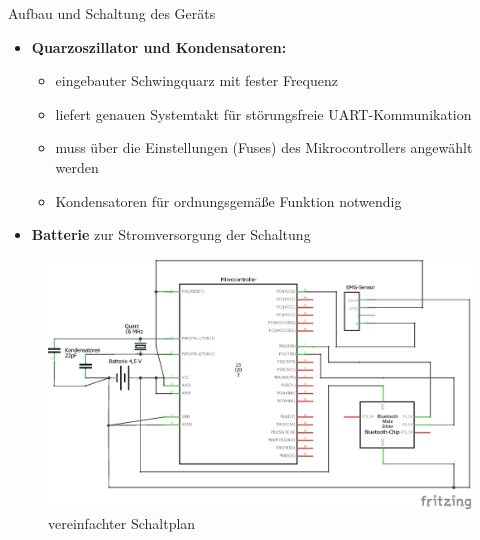\documentclass[final,20pt]{beamer}
\newlength{\colwidth}
\begin{document}
\begin{frame}[t]
\begin{columns}[t]
\begin{column}{\colwidth}
\begin{alertblock}{Aufbau und Schaltung des Geräts}
\begin{itemize}
\begin{itemize}
  		\end{itemize}
  		\item \textbf{Quarzoszillator und Kondensatoren:}
  		\begin{itemize}
  			\item eingebauter Schwingquarz mit fester Frequenz
  			\item liefert genauen Systemtakt für störungsfreie UART-Kommunikation
  			\item muss über die Einstellungen (Fuses) des Mikrocontrollers angewählt werden
  			\item Kondensatoren für ordnungsgemäße Funktion notwendig
  		\end{itemize}
  		\item \textbf{Batterie} zur Stromversorgung der Schaltung
  	\end{itemize}
  
  	\begin{figure}[H]
  		\centering
  		\includegraphics[width=0.8\colwidth]{pics/mikrocontroller-schaltplan}
  		\caption{vereinfachter Schaltplan}
  		\label{fig:mcsp}
  	\end{figure}
  \end{alertblock}


\end{column}
\end{columns}
\end{frame}
\end{document}
